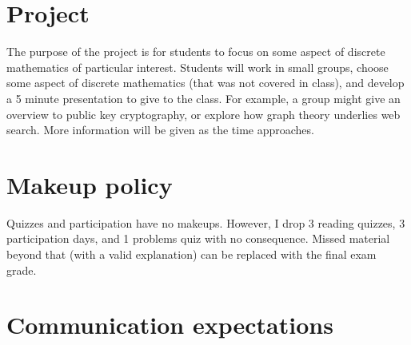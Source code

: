 \documentclass[letterpaper]{inzane_syllabus} %
\begin{document}


\vspace{0.5cm}
\section{Project} 

The purpose of the project is for students to focus on some aspect of discrete mathematics of particular interest.  Students will work in small groups, choose some aspect of discrete mathematics (that was not covered in class), and develop a 5 minute presentation to give to the class.   For example, a group might give an overview to public key cryptography, or explore how graph theory underlies web search.   More information will be given as the time approaches.


\vspace{0.5cm}
\section{Makeup policy}

Quizzes and participation have no makeups. However, I drop 3 reading quizzes, 3 participation days, and 1 problems quiz with no consequence. Missed material beyond that (with a valid explanation) can be replaced with the final exam grade.

\vspace{0.5cm}
\section{Communication expectations}
\end{document}
